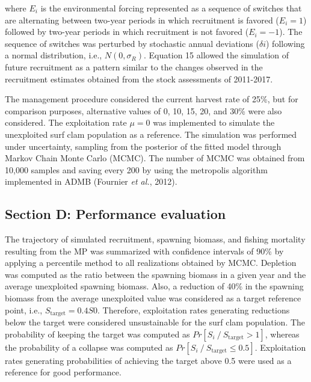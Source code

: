 \documentclass[12pt]{article}
\begin{document}
where \(E_i\) is the environmental forcing represented as a sequence of
switches that are alternating between two-year periods in which
recruitment is favored (\(E_i = 1\)) followed by two-year periods in
which recruitment is not favored (\(E_i = -1\)). The sequence of
switches was perturbed by stochastic annual deviations (\(\delta i\))
following a normal distribution, i.e., \(N(0,\sigma_R)\). Equation 15
allowed the simulation of future recruitment as a pattern similar to the
changes observed in the recruitment estimates obtained from the stock
assessments of 2011-2017.

The management procedure considered the current harvest rate of 25\%,
but for comparison purposes, alternative values of 0, 10, 15, 20, and
30\% were also considered. The exploitation rate \(\mu=0\) was
implemented to simulate the unexploited surf clam population as a
reference. The simulation was performed under uncertainty, sampling from
the posterior of the fitted model through Markov Chain Monte Carlo
(MCMC). The number of MCMC was obtained from 10,000 samples and saving
every 200 by using the metropolis algorithm implemented in ADMB
(Fournier \emph{et al.}, 2012).

\hypertarget{section-d-performance-evaluation}{%
\subsection{Section D: Performance
evaluation}\label{section-d-performance-evaluation}}

The trajectory of simulated recruitment, spawning biomass, and fishing
mortality resulting from the MP was summarized with confidence intervals
of 90\% by applying a percentile method to all realizations obtained by
MCMC. Depletion was computed as the ratio between the spawning biomass
in a given year and the average unexploited spawning biomass. Also, a
reduction of 40\% in the spawning biomass from the average unexploited
value was considered as a target reference point, i.e.,
\(S_{\text{target}} = 0.4S0\). Therefore, exploitation rates generating
reductions below the target were considered unsustainable for the surf
clam population. The probability of keeping the target was computed as
\(Pr[S_i⁄S_{\text{target}} > 1]\), whereas the probability of a collapse
was computed as \(Pr[S_i⁄S_{\text{target}} \leq 0.5]\). Exploitation
rates generating probabilities of achieving the target above 0.5 were
used as a reference for good performance.

\FloatBarrier
\end{document}
